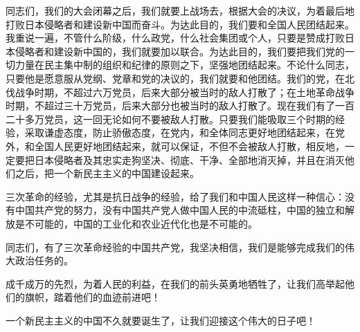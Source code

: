 同志们，我们的大会闭幕之后，我们就要上战场去，根据大会的决议，为着最后地打败日本侵略者和建设新中国而奋斗。为达此目的，我们要和全国人民团结起来。我重说一遍，不管什么阶级，什么政党，什么社会集团或个人，只要是赞成打败日本侵略者和建设新中国的，我们就要加以联合。为达此目的，我们要把我们党的一切力量在民主集中制的组织和纪律的原则之下，坚强地团结起来。不论什么同志，只要他是愿意服从党纲、党章和党的决议的，我们就要和他团结。我们的党，在北伐战争时期，不超过六万党员，后来大部分被当时的敌人打散了；在土地革命战争时期，不超过三十万党员，后来大部分也被当时的敌人打散了。现在我们有了一百二十多万党员，这一回无论如何不要被敌人打散。只要我们能吸取三个时期的经验，采取谦虚态度，防止骄傲态度，在党内，和全体同志更好地团结起来，在党外，和全国人民更好地团结起来，就可以保证，不但不会被敌人打散，相反地，一定要把日本侵略者及其忠实走狗坚决、彻底、干净、全部地消灭掉，并且在消灭他们之后，把一个新民主主义的中国建设起来。

三次革命的经验，尤其是抗日战争的经验，给了我们和中国人民这样一种信心：没有中国共产党的努力，没有中国共产党人做中国人民的中流砥柱，中国的独立和解放是不可能的，中国的工业化和农业近代化也是不可能的。

同志们，有了三次革命经验的中国共产党，我坚决相信，我们是能够完成我们的伟大政治任务的。

成千成万的先烈，为着人民的利益，在我们的前头英勇地牺牲了，让我们高举起他们的旗帜，踏着他们的血迹前进吧！

一个新民主主义的中国不久就要诞生了，让我们迎接这个伟大的日子吧！


